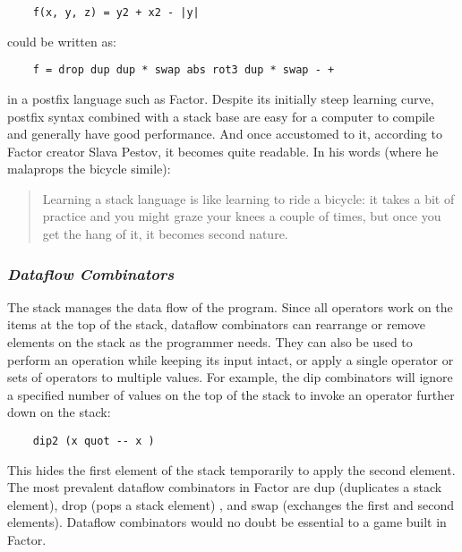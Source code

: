\documentclass{sig-alternate}
\begin{document}
\begin{verbatim}
	f(x, y, z) = y2 + x2 - |y|
\end{verbatim}

could be written as: 

\begin{verbatim}
	f = drop dup dup * swap abs rot3 dup * swap - +
\end{verbatim}

in a postfix language such as Factor. Despite its initially steep learning curve, postfix syntax combined with a stack base are easy for a computer to compile and generally have good performance. And once accustomed to it, according to Factor creator Slava Pestov, it becomes quite readable. In his words (where he malaprops the bicycle simile): 
\begin{quotation}
Learning a stack language is like learning to ride a bicycle: it takes a bit of practice and you might graze your knees a couple of times, but once you get the hang of it, it becomes second nature.
\end{quotation}

\subsubsection*{\textit{Dataflow Combinators}}
The stack manages the data flow of the program. Since all operators work on the items at the top of the stack, dataflow combinators can rearrange or remove elements on the stack as the programmer needs. They can also be used to perform an operation while keeping its input intact, or apply a single operator or sets of operators to multiple values. For example, the dip combinators will ignore a specified number of values on the top of the stack to invoke an operator further down on the stack:

\begin{verbatim}
	dip2 (x quot -- x ) 
\end{verbatim}

This hides the first element of the stack temporarily to apply the second element. The most prevalent dataflow combinators in Factor are dup (duplicates a stack element), drop (pops a stack element) , and swap (exchanges the first and second elements). Dataflow combinators would no doubt be essential to a game built in Factor.
\end{document}
